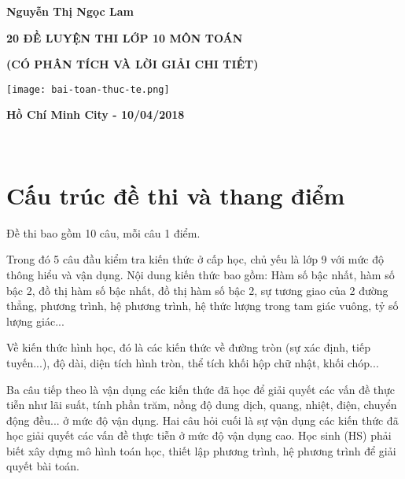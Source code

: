\documentclass[12pt]{article}
\begin{document}
\begin{titlepage}
	\thispagestyle{empty}
	\begin{center}
		
		\vspace*{2cm}
		
		{\large\bf  Nguyễn Thị Ngọc Lam}
		
		\vspace*{2cm}
		
		{\Large\bf 20 ĐỀ LUYỆN THI LỚP 10 MÔN TOÁN}
		
		\vspace*{0.5cm}
		
		{\large\bf (CÓ PHÂN TÍCH VÀ LỜI GIẢI CHI TIẾT)}
		
		\vspace*{5cm}
		\texttt{[image: bai-toan-thuc-te.png]}
		\vfill
		
		{\bf Hồ Chí Minh City - 10/04/2018}
	\end{center}
\end{titlepage}

\break

\tableofcontents

\

\section{Cấu trúc đề thi và thang điểm}

Đề thi bao gồm 10 câu, mỗi câu 1 điểm. \par

Trong đó 5 câu đầu kiểm tra kiến thức ở cấp học, chủ yếu là lớp 9 với mức độ thông hiểu và vận dụng. Nội dung kiến thức bao gồm: Hàm số bậc nhất, hàm số bậc 2, đồ thị hàm số bậc nhất, đồ thị hàm số bậc 2, sự tương giao của 2 đường thẳng, phương trình, hệ phương trình, hệ thức lượng trong tam giác vuông, tỷ số lượng giác... \par

Về kiến thức hình học, đó là các kiến thức về đường tròn (sự xác định, tiếp tuyến...), độ dài, diện tích hình tròn, thể tích khối hộp chữ nhật, khối chóp... \par

Ba câu tiếp theo là vận dụng các kiến thức đã học để giải quyết các vấn đề thực tiễn như lãi suất, tính phần trăm, nồng độ dung dịch, quang, nhiệt, điện, chuyển động đều... ở mức độ vận dụng. Hai câu hỏi cuối là sự vận dụng các kiến thức đã học giải quyết các vấn đề thực tiễn ở mức độ vận dụng cao. Học sinh (HS) phải biết xây dựng mô hình toán học, thiết lập phương trình, hệ phương trình để giải quyết bài toán. \par
\end{document}
